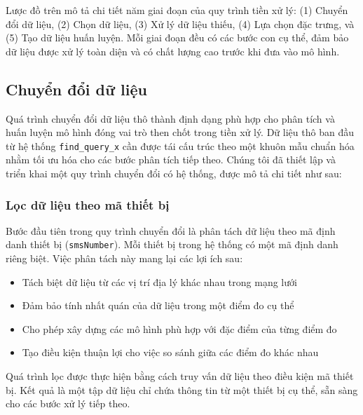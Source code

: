 Lược đồ trên mô tả chi tiết năm giai đoạn của quy trình tiền xử lý: (1) Chuyển đổi dữ liệu, (2) Chọn dữ liệu, (3) Xử lý dữ liệu thiếu, (4) Lựa chọn đặc trưng, và (5) Tạo dữ liệu huấn luyện. Mỗi giai đoạn đều có các bước con cụ thể, đảm bảo dữ liệu được xử lý toàn diện và có chất lượng cao trước khi đưa vào mô hình.

\subsection{Chuyển đổi dữ liệu}
Quá trình chuyển đổi dữ liệu thô thành định dạng phù hợp cho phân tích và huấn luyện mô hình đóng vai trò then chốt trong tiền xử lý. Dữ liệu thô ban đầu từ hệ thống \texttt{find\_query\_x} cần được tái cấu trúc theo một khuôn mẫu chuẩn hóa nhằm tối ưu hóa cho các bước phân tích tiếp theo. Chúng tôi đã thiết lập và triển khai một quy trình chuyển đổi có hệ thống, được mô tả chi tiết như sau:

\subsubsection{Lọc dữ liệu theo mã thiết bị}
Bước đầu tiên trong quy trình chuyển đổi là phân tách dữ liệu theo mã định danh thiết bị (\texttt{smsNumber}). Mỗi thiết bị trong hệ thống có một mã định danh riêng biệt. Việc phân tách này mang lại các lợi ích sau:

\begin{itemize}
    \item Tách biệt dữ liệu từ các vị trí địa lý khác nhau trong mạng lưới
    \item Đảm bảo tính nhất quán của dữ liệu trong một điểm đo cụ thể
    \item Cho phép xây dựng các mô hình phù hợp với đặc điểm của từng điểm đo
    \item Tạo điều kiện thuận lợi cho việc so sánh giữa các điểm đo khác nhau
\end{itemize}

Quá trình lọc được thực hiện bằng cách truy vấn dữ liệu theo điều kiện mã thiết bị. Kết quả là một tập dữ liệu chỉ chứa thông tin từ một thiết bị cụ thể, sẵn sàng cho các bước xử lý tiếp theo.


